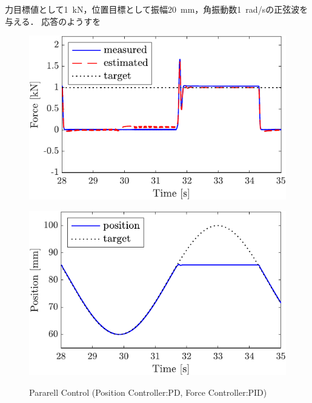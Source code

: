 力目標値として\SI{1}{kN}，位置目標として振幅\SI{20}{mm}，角振動数\SI{1}{rad/s}の正弦波を与える．
応答のようすを
\begin{figure}[t]
    \begin{minipage}{\minipageratio\hsize}
    \centering
        \includegraphics[keepaspectratio, scale = \minifigscale]{contents/IntegrationControl/figure/SECASQ/crop-FBsw_PID_force.pdf}
        \label{fig5:crop-FBsw_PID_force}
    \end{minipage}
    \begin{minipage}{\minipageratio\hsize}
    \centering
        \includegraphics[keepaspectratio, scale = \minifigscale]
        {contents/IntegrationControl/figure/SECASQ/crop-FBsw_PID_pos.pdf}
        \label{fig5:crop-FBsw_PID_pos}
    \end{minipage}
    \caption{Pararell Control (Position Controller:PD, Force Controller:PID)}   
    \label{fig5:crop-FBsw_PID}
\end{figure}

